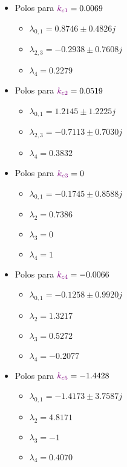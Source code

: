 \begin{multicols}{2}
  \begin{itemize}
  \item Polos para \(\mathbin{\color{violet}k_{c1}} = 0.0069  \) 
    \begin{itemize}
      \item $\lambda_{0,1} = 0.8746 \pm 0.4826j$
      \item $\lambda_{2,3} = -0.2938 \pm 0.7608j$
      \item $\lambda_{4} = 0.2279$
    \end{itemize}

  \item Polos para \(\mathbin{\color{violet}k_{c2}} = 0.0519\)
    \begin{itemize}
      \item $\lambda_{0,1} = 1.2145 \pm 1.2225j$
      \item $\lambda_{2,3} = -0.7113 \pm 0.7030j$
      \item $\lambda_{4} = 0.3832$
    \end{itemize}

  \item Polos para \(\mathbin{\color{violet}k_{c3}} = 0\)
    \begin{itemize}
      \item $\lambda_{0,1} = -0.1745 \pm 0.8588j$
      \item $\lambda_{2} = 0.7386$
      \item $\lambda_{3} = 0$
      \item $\lambda_{4} = 1$
    \end{itemize}

    \columnbreak

  \item Polos para \(\mathbin{\color{violet}k_{c4}} = -0.0066\)
    \begin{itemize}
      \item $\lambda_{0,1} = -0.1258 \pm 0.9920j$
      \item $\lambda_{2} = 1.3217$
      \item $\lambda_{3} = 0.5272$
      \item $\lambda_{4} = -0.2077$
    \end{itemize}

  \item Polos para \(\mathbin{\color{violet}k_{c5}} = -1.4428\)
    \begin{itemize}
      \item $\lambda_{0,1} = -1.4173 \pm 3.7587j$
      \item $\lambda_{2} = 4.8171$
      \item $\lambda_{3} = -1$
      \item $\lambda_{4} = 0.4070$
    \end{itemize}
  \end{itemize}
\end{multicols}

